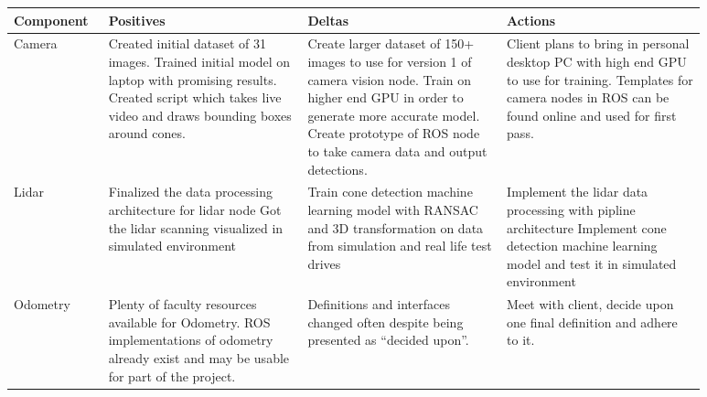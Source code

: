 \documentclass[10pt, onecolumn, draftclsnofoot, letterpaper,compsoc]{IEEEtran}
\begin{document}
\begin{tabular}{|p{0.1\linewidth}|p{0.26\linewidth}|p{0.26\linewidth}|p{0.26\linewidth}|}
\hline
\centering Component &
\centering Positives & 
\centering Deltas & 
\centering Actions \tabularnewline
\hline
\centering Camera 
& %
Created initial dataset of 31 images. \newline
Trained initial model on laptop with promising results. \newline
Created script which takes live video and draws bounding boxes around cones. \newline
& %
Create larger dataset of 150+ images to use for version 1 of camera vision node. \newline
Train on higher end GPU in order to generate more accurate model. \newline 
Create prototype of ROS node to take camera data and output detections. \newline
& %
Client plans to bring in personal desktop PC with high end GPU to use for training. \newline
Templates for camera nodes in ROS can be found online and used for first pass. \newline
\\ \hline

\centering Lidar 
& %
Finalized the data processing architecture for lidar node \newline
Got the lidar scanning visualized in simulated environment \newline

& %
Train cone detection machine learning model with RANSAC and 3D transformation on data from simulation and real life test drives \newline

& %
Implement the lidar data processing with pipline architecture \newline
Implement cone detection machine learning model and test it in simulated environment \newline

\\ \hline

\centering Odometry
& %
Plenty of faculty resources available for Odometry.\newline
ROS implementations of odometry already exist and may be usable for part of the project.\newline
& %
Definitions and interfaces changed often despite being presented as “decided upon”.\newline
& %
Meet with client, decide upon one final definition and adhere to it.\newline
\\ \hline  


\end{tabular}
\end{document}
